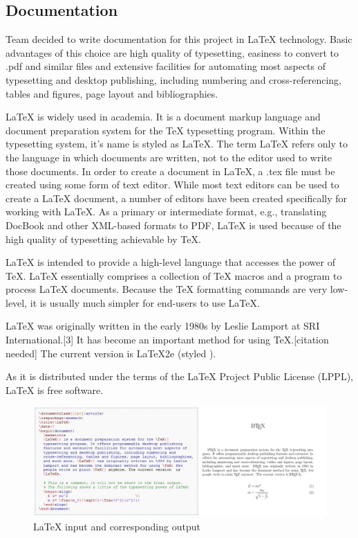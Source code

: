 \subsection{Documentation}

Team decided to write documentation for this project in LaTeX technology. Basic advantages of this choice are high quality of typesetting, easiness to convert to .pdf and similar files and extensive facilities for automating most aspects of typesetting and desktop publishing, including numbering and cross-referencing, tables and figures, page layout and bibliographies.\newline

LaTeX is widely used in academia. It is a document markup language and document preparation system for the TeX typesetting program. Within the typesetting system, it's name is styled as \LaTeX. The term LaTeX refers only to the language in which documents are written, not to the editor used to write those documents. In order to create a document in LaTeX, a .tex file must be created using some form of text editor. While most text editors can be used to create a LaTeX document, a number of editors have been created specifically for working with LaTeX. As a primary or intermediate format, e.g., translating DocBook and other XML-based formats to PDF, LaTeX is used because of the high quality of typesetting achievable by TeX.\newline

LaTeX is intended to provide a high-level language that accesses the power of TeX. LaTeX essentially comprises a collection of TeX macros and a program to process LaTeX documents. Because the TeX formatting commands are very low-level, it is usually much simpler for end-users to use LaTeX.\newline

LaTeX was originally written in the early 1980s by Leslie Lamport at SRI International.[3] It has become an important method for using TeX.[citation needed] The current version is LaTeX2e (styled \LaTeXe).\newline

As it is distributed under the terms of the LaTeX Project Public License (LPPL), LaTeX is free software.

\begin{figure}[htb]
	\centering
	\includegraphics[width=1\textwidth]{prestudy/latex.JPG}
	\caption{LaTeX input and corresponding output\cite{wiki:latex}}
	\label{fig:latex}
\end{figure}


